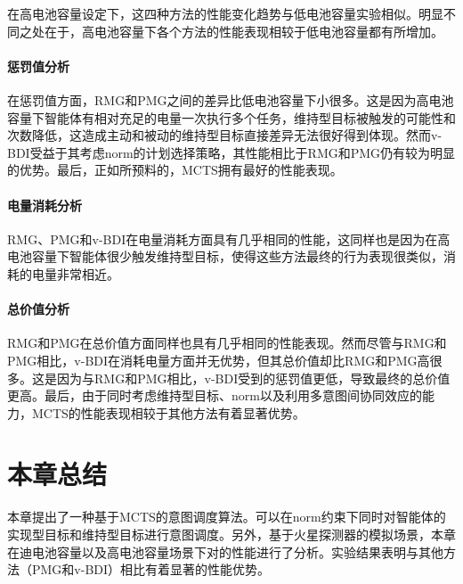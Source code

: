 在高电池容量设定下，这四种方法的性能变化趋势与低电池容量实验相似。明显不同之处在于，高电池容量下各个方法的性能表现相较于低电池容量都有所增加。
\paragraph{惩罚值分析}
在惩罚值方面，RMG和PMG之间的差异比低电池容量下小很多。这是因为高电池容量下智能体有相对充足的电量一次执行多个任务，维持型目标被触发的可能性和次数降低，这造成主动和被动的维持型目标直接差异无法很好得到体现。然而v-BDI受益于其考虑norm的计划选择策略，其性能相比于RMG和PMG仍有较为明显的优势。最后，正如所预料的，MCTS拥有最好的性能表现。
\paragraph{电量消耗分析}
RMG、PMG和v-BDI在电量消耗方面具有几乎相同的性能，这同样也是因为在高电池容量下智能体很少触发维持型目标，使得这些方法最终的行为表现很类似，消耗的电量非常相近。
\paragraph{总价值分析}
RMG和PMG在总价值方面同样也具有几乎相同的性能表现。然而尽管与RMG和PMG相比，v-BDI在消耗电量方面并无优势，但其总价值却比RMG和PMG高很多。这是因为与RMG和PMG相比，v-BDI受到的惩罚值更低，导致最终的总价值更高。最后，由于同时考虑维持型目标、norm以及利用多意图间协同效应的能力，MCTS的性能表现相较于其他方法有着显著优势。

\section{本章总结}
本章提出了一种基于MCTS的意图调度算法\SAT 。\SAT 可以在norm约束下同时对智能体的实现型目标和维持型目标进行意图调度。另外，基于火星探测器的模拟场景，本章在迪电池容量以及高电池容量场景下对\SAT 的性能进行了分析。实验结果表明\SAT 与其他方法（PMG和v-BDI）相比有着显著的性能优势。
